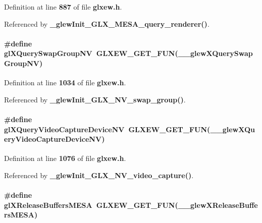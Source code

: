 Definition at line {\bf 887} of file {\bf glxew.\+h}.



Referenced by {\bf \+\_\+glew\+Init\+\_\+\+G\+L\+X\+\_\+\+M\+E\+S\+A\+\_\+query\+\_\+renderer()}.

\paragraph[{gl\+X\+Query\+Swap\+Group\+NV}]{\setlength{\rightskip}{0pt plus 5cm}\#define gl\+X\+Query\+Swap\+Group\+NV~{\bf G\+L\+X\+E\+W\+\_\+\+G\+E\+T\+\_\+\+F\+UN}({\bf \+\_\+\+\_\+glew\+X\+Query\+Swap\+Group\+NV})}\label{glxew_8h_adf5366445d90bfe81f3fcd31c990b82c}


Definition at line {\bf 1034} of file {\bf glxew.\+h}.



Referenced by {\bf \+\_\+glew\+Init\+\_\+\+G\+L\+X\+\_\+\+N\+V\+\_\+swap\+\_\+group()}.

\paragraph[{gl\+X\+Query\+Video\+Capture\+Device\+NV}]{\setlength{\rightskip}{0pt plus 5cm}\#define gl\+X\+Query\+Video\+Capture\+Device\+NV~{\bf G\+L\+X\+E\+W\+\_\+\+G\+E\+T\+\_\+\+F\+UN}({\bf \+\_\+\+\_\+glew\+X\+Query\+Video\+Capture\+Device\+NV})}\label{glxew_8h_a662d7dba95d8eeee7ff23d3cf8fe8047}


Definition at line {\bf 1076} of file {\bf glxew.\+h}.



Referenced by {\bf \+\_\+glew\+Init\+\_\+\+G\+L\+X\+\_\+\+N\+V\+\_\+video\+\_\+capture()}.

\paragraph[{gl\+X\+Release\+Buffers\+M\+E\+SA}]{\setlength{\rightskip}{0pt plus 5cm}\#define gl\+X\+Release\+Buffers\+M\+E\+SA~{\bf G\+L\+X\+E\+W\+\_\+\+G\+E\+T\+\_\+\+F\+UN}({\bf \+\_\+\+\_\+glew\+X\+Release\+Buffers\+M\+E\+SA})}\label{glxew_8h_ae4c8589eb57011098d2ec7a9a86c0211}


